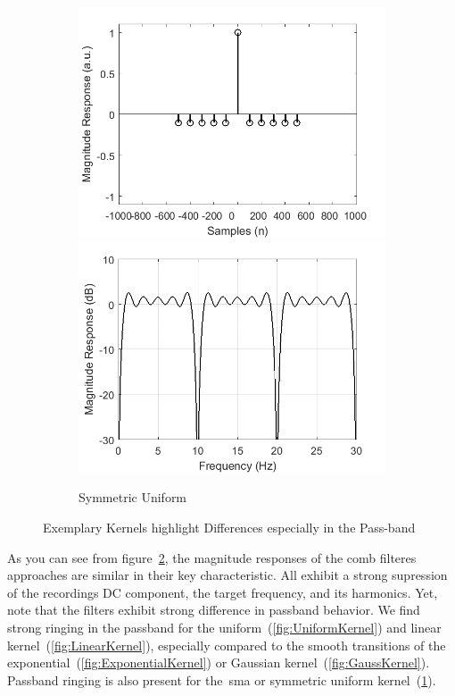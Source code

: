 \documentclass[a4paper]{article}
\begin{document}
\begin{figure}[hbtp]
\begin{subfigure}{.16\textwidth}
        \includegraphics[width=\textwidth]{img/sym/kernel_ave.png}\\
        \includegraphics[width=\textwidth]{img/sym/mag_ave.png}
        \caption{\scriptsize{Symmetric Uniform}}\label{fig:SymmetricUniform}
    \end{subfigure}
    \caption{Exemplary Kernels highlight Differences especially in the Pass-band}\label{fig:ExemplaryCausalKernels}
\end{figure}

As you can see from figure~\ref{fig:ExemplaryCausalKernels}, the magnitude responses of the comb filteres approaches are similar in their key characteristic. All exhibit a strong supression of the recordings DC component, the target frequency, and its harmonics.
Yet, note that the filters exhibit strong difference in passband behavior. We find strong ringing in the passband for the uniform~(\ref{fig:UniformKernel}) and linear kernel~(\ref{fig:LinearKernel}), especially compared to the smooth transitions of the exponential~(\ref{fig:ExponentialKernel}) or Gaussian kernel~(\ref{fig:GaussKernel}).
Passband ringing is also present for the~\gls{sma} or symmetric uniform kernel~(\ref{fig:SymmetricUniform}).
\end{document}
